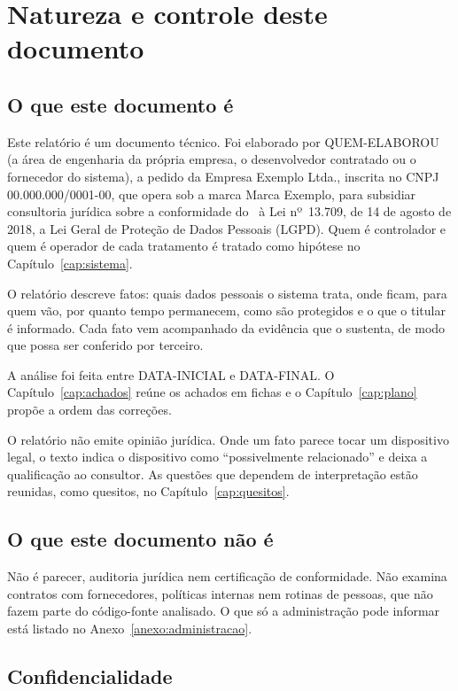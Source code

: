 \chapter*{Natureza e controle deste documento}

\section*{O que este documento é}

Este relatório é um documento técnico. Foi elaborado por QUEM-ELABOROU (a área de engenharia da própria empresa, o desenvolvedor contratado ou o fornecedor do sistema), a pedido da Empresa Exemplo Ltda., inscrita no CNPJ 00.000.000/0001-00, que opera sob a marca Marca Exemplo, para subsidiar consultoria jurídica sobre a conformidade do \NomeDoProduto\ à Lei nº~13.709, de 14 de agosto de 2018, a Lei Geral de Proteção de Dados Pessoais (LGPD). Quem é controlador e quem é operador de cada tratamento é tratado como hipótese no Capítulo~\ref{cap:sistema}.

O relatório descreve fatos: quais dados pessoais o sistema trata, onde ficam, para quem vão, por quanto tempo permanecem, como são protegidos e o que o titular é informado. Cada fato vem acompanhado da evidência que o sustenta, de modo que possa ser conferido por terceiro.

A análise foi feita entre DATA-INICIAL e DATA-FINAL. O Capítulo~\ref{cap:achados} reúne os achados em fichas e o Capítulo~\ref{cap:plano} propõe a ordem das correções.

O relatório não emite opinião jurídica. Onde um fato parece tocar um dispositivo legal, o texto indica o dispositivo como \enquote{possivelmente relacionado} e deixa a qualificação ao consultor. As questões que dependem de interpretação estão reunidas, como quesitos, no Capítulo~\ref{cap:quesitos}.

\section*{O que este documento não é}

Não é parecer, auditoria jurídica nem certificação de conformidade. Não examina contratos com fornecedores, políticas internas nem rotinas de pessoas, que não fazem parte do código-fonte analisado. O que só a administração pode informar está listado no Anexo~\ref{anexo:administracao}.

\section*{Confidencialidade}

